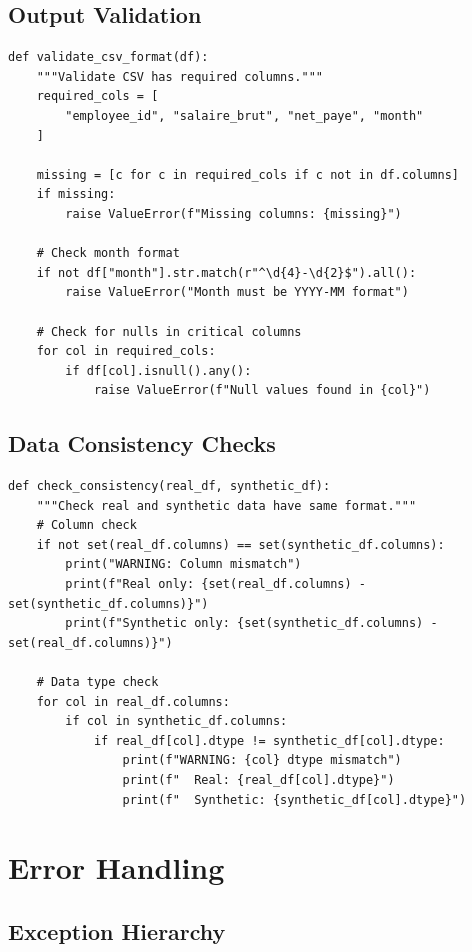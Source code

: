 \subsection{Output Validation}

\begin{lstlisting}[style=pythonstyle]
def validate_csv_format(df):
    """Validate CSV has required columns."""
    required_cols = [
        "employee_id", "salaire_brut", "net_paye", "month"
    ]
    
    missing = [c for c in required_cols if c not in df.columns]
    if missing:
        raise ValueError(f"Missing columns: {missing}")
    
    # Check month format
    if not df["month"].str.match(r"^\d{4}-\d{2}$").all():
        raise ValueError("Month must be YYYY-MM format")
    
    # Check for nulls in critical columns
    for col in required_cols:
        if df[col].isnull().any():
            raise ValueError(f"Null values found in {col}")
\end{lstlisting}

\subsection{Data Consistency Checks}

\begin{lstlisting}[style=pythonstyle]
def check_consistency(real_df, synthetic_df):
    """Check real and synthetic data have same format."""
    # Column check
    if not set(real_df.columns) == set(synthetic_df.columns):
        print("WARNING: Column mismatch")
        print(f"Real only: {set(real_df.columns) - set(synthetic_df.columns)}")
        print(f"Synthetic only: {set(synthetic_df.columns) - set(real_df.columns)}")
    
    # Data type check
    for col in real_df.columns:
        if col in synthetic_df.columns:
            if real_df[col].dtype != synthetic_df[col].dtype:
                print(f"WARNING: {col} dtype mismatch")
                print(f"  Real: {real_df[col].dtype}")
                print(f"  Synthetic: {synthetic_df[col].dtype}")
\end{lstlisting}

\section{Error Handling}

\subsection{Exception Hierarchy}

